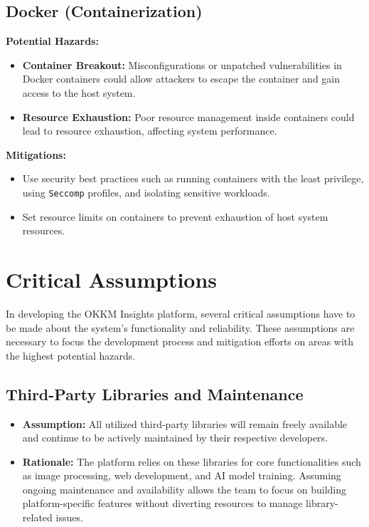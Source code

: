 \documentclass{article}
\begin{document}
\subsection{Docker (Containerization)}
\textbf{Potential Hazards:}
\begin{itemize}
    \item \textbf{Container Breakout:} Misconfigurations or unpatched vulnerabilities in Docker containers could allow attackers to escape the container and gain access to the host system.
    \item \textbf{Resource Exhaustion:} Poor resource management inside containers could lead to resource exhaustion, affecting system performance.
\end{itemize}
\textbf{Mitigations:}
\begin{itemize}
    \item Use security best practices such as running containers with the least privilege, using \texttt{Seccomp} profiles, and isolating sensitive workloads.
    \item Set resource limits on containers to prevent exhaustion of host system resources.
\end{itemize}

\section{Critical Assumptions}

In developing the OKKM Insights platform, several critical assumptions have to be made about the system's functionality and reliability. These assumptions are necessary to focus the development process and mitigation efforts on areas with the highest potential hazards.

\subsection*{Third-Party Libraries and Maintenance}
\begin{itemize}
  \item \textbf{Assumption:} All utilized third-party libraries will remain freely available and continue to be actively maintained by their respective developers.
  \item \textbf{Rationale:} The platform relies on these libraries for core functionalities such as image processing, web development, and AI model training. Assuming ongoing maintenance and availability allows the team to focus on building platform-specific features without diverting resources to manage library-related issues.
\end{itemize}
\end{document}
